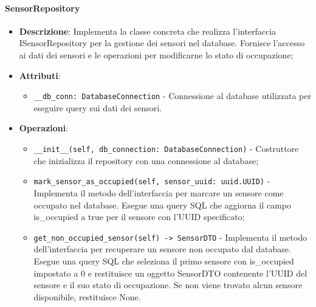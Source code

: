 \documentclass[10pt]{article}
\begin{document}
    \paragraph{SensorRepository}
    \begin{itemize} 
    \item \textbf{Descrizione}: Implementa la classe concreta che realizza l'interfaccia ISensorRepository per la gestione dei sensori nel database. Fornisce l'accesso ai dati dei sensori e le operazioni per modificarne lo stato di occupazione;
    \item \textbf{Attributi}:
    \begin{itemize}
        \item \texttt{\_\_db\_conn: DatabaseConnection} - Connessione al database utilizzata per eseguire query sui dati dei sensori.
    \end{itemize}
    
    \item \textbf{Operazioni}:
    \begin{itemize}
        \item \texttt{\_\_init\_\_(self, db\_connection: DatabaseConnection)} - Costruttore che inizializza il repository con una connessione al database;
        
        \item \texttt{mark\_sensor\_as\_occupied(self, sensor\_uuid: uuid.UUID)} - Implementa il metodo dell'interfaccia per marcare un sensore come occupato nel database. Esegue una query SQL che aggiorna il campo is\_occupied a true per il sensore con l'UUID specificato;
        
        \item \texttt{get\_non\_occupied\_sensor(self) -> SensorDTO} - Implementa il metodo dell'interfaccia per recuperare un sensore non occupato dal database. Esegue una query SQL che seleziona il primo sensore con is\_occupied impostato a 0 e restituisce un oggetto SensorDTO contenente l'UUID del sensore e il suo stato di occupazione. Se non viene trovato alcun sensore disponibile, restituisce None.
    \end{itemize}
    \end{itemize}
\end{document}
